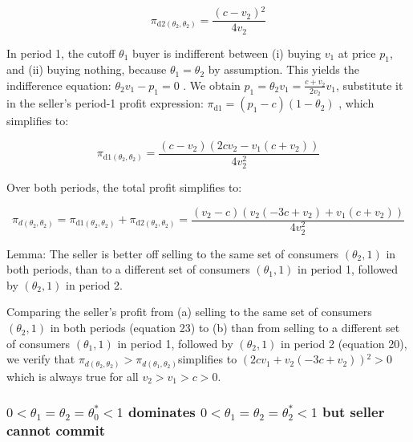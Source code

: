 \documentclass{article}
\begin{document}
\begin{equation}
\pi _{\text{d2}\left(\theta _2,\theta _2\right)}=\frac{\left(c-v_2\right){}^2}{4 v_2}
\end{equation}

In period 1, the cutoff \(\theta _1\) buyer is indifferent between (i) buying \(v_1\) at price \(p_1\), and (ii) buying nothing, because \(\theta
_1=\theta _2\) by assumption. This { }yields the indifference equation: \(\theta _2v_1 - p_1 = 0\) . We obtain \(p_1=\theta _2v_1=\frac{c+v_2}{2
v_2}v_1\), substitute it in the seller{'}s period-1 profit expression: \(\pi _{\text{d1}}=\left(p_1-c\right)\left(1-\theta _2\right)\) , which simplifies
to:

\begin{equation}
\pi _{\text{d1}\left(\theta _2,\theta _2\right)}=\frac{\left(c-v_2\right) \left(2 c v_2-v_1 \left(c+v_2\right)\right)}{4 v_2^2}
\end{equation}

Over both periods, the total profit simplifies to:

\begin{equation}
\pi _{d\left(\theta _2,\theta _2\right)}=\pi _{\text{d1}\left(\theta _2,\theta _2\right)}+\pi _{\text{d2}\left(\theta _2,\theta _2\right)}=\frac{\left(v_2-c\right)
\left(v_2 \left(-3 c+v_2\right)+v_1 \left(c+v_2\right)\right)}{4 v_2^2}
\end{equation}

Lemma: The seller is better off selling to the same set of consumers \(\left(\theta _2,1\right)\) in both periods, than to a different set of consumers
\(\left(\theta _1,1\right)\) in period 1, followed by \(\left(\theta _2,1\right)\) in period 2. 


Comparing the seller{'}s profit from (a) selling to the same set of consumers \(\left(\theta _2,1\right)\) in both periods (equation 23) to (b) than
from selling to a different set of consumers \(\left(\theta _1,1\right)\) in period 1, followed by \(\left(\theta _2,1\right)\) in period 2 (equation
20), we verify that \(\pi _{d\left(\theta _2,\theta _2\right)}>\pi _{d\left(\theta _1,\theta _2\right)}\)simplifies to \(\left(2 c v_1+v_2 \left(-3
c+v_2\right)\right){}^2>0\) which is always true for all \(v_2>v_1>c>0\).

\subsubsection*{\(0<\theta _1=\theta _2=\theta _0^*<1\) dominates \(0<\theta _1=\theta _2=\theta _2^*<1\) but seller cannot commit}
\end{document}

